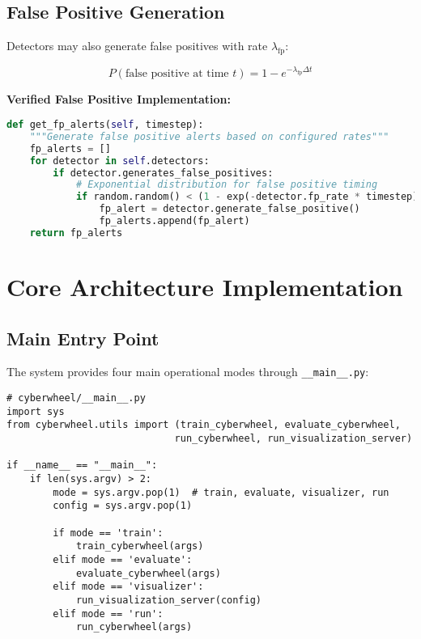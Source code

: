 \documentclass[12pt,a4paper]{article}
\begin{document}
\subsection{False Positive Generation}
Detectors may also generate false positives with rate $\lambda_{\text{fp}}$:

\begin{equation}
P(\text{false positive at time } t) = 1 - e^{-\lambda_{\text{fp}} \Delta t}
\end{equation}

\textbf{Verified False Positive Implementation:}
\begin{lstlisting}[language=Python, caption=False Positive Logic (cyberwheel/detectors/handler.py)]
def get_fp_alerts(self, timestep):
    """Generate false positive alerts based on configured rates"""
    fp_alerts = []
    for detector in self.detectors:
        if detector.generates_false_positives:
            # Exponential distribution for false positive timing
            if random.random() < (1 - exp(-detector.fp_rate * timestep)):
                fp_alert = detector.generate_false_positive()
                fp_alerts.append(fp_alert)
    return fp_alerts
\end{lstlisting}

\section{Core Architecture Implementation}

\subsection{Main Entry Point}
The system provides four main operational modes through \texttt{\_\_main\_\_.py}:

\begin{lstlisting}[caption=Main CLI Interface Implementation]
# cyberwheel/__main__.py
import sys
from cyberwheel.utils import (train_cyberwheel, evaluate_cyberwheel, 
                             run_cyberwheel, run_visualization_server)

if __name__ == "__main__":
    if len(sys.argv) > 2:
        mode = sys.argv.pop(1)  # train, evaluate, visualizer, run
        config = sys.argv.pop(1)
        
        if mode == 'train':
            train_cyberwheel(args)
        elif mode == 'evaluate':
            evaluate_cyberwheel(args)
        elif mode == 'visualizer':
            run_visualization_server(config)
        elif mode == 'run':
            run_cyberwheel(args)
\end{lstlisting}
\end{document}
